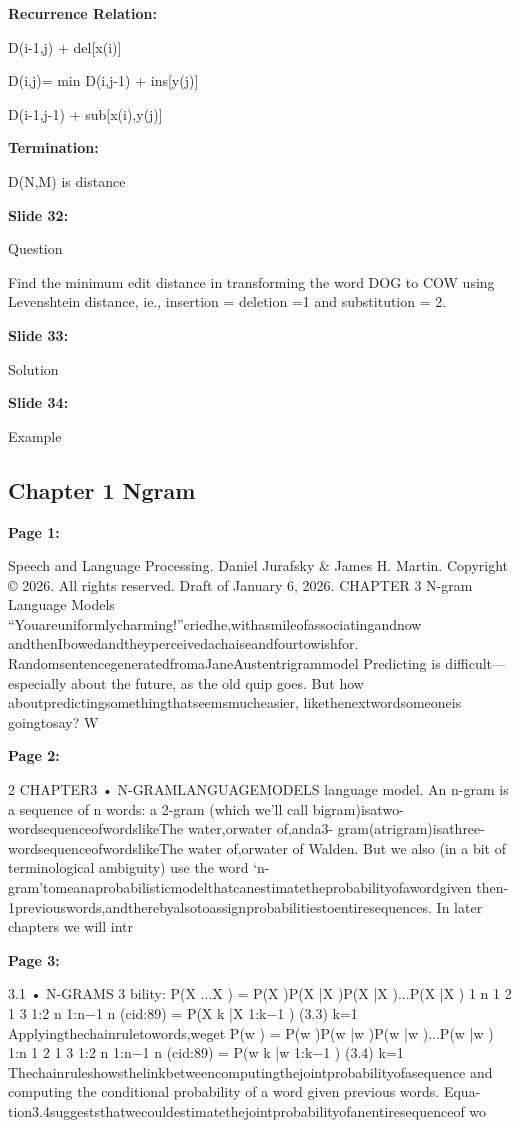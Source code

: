\documentclass[11pt,a4paper]{article}
\begin{document}
\textbf{Recurrence Relation:} 

D(i-1,j)   + del[x(i)]

D(i,j)= min  D(i,j-1)   + ins[y(j)]

D(i-1,j-1) + sub[x(i),y(j)]

\textbf{Termination:} 

D(N,M) is distance

\textbf{Slide 32:}

Question

Find the minimum edit distance in transforming the word DOG to COW using Levenshtein distance, ie., insertion = deletion =1 and substitution = 2.

\textbf{Slide 33:}

Solution

\textbf{Slide 34:}

Example


\subsection{Chapter 1 Ngram}

\textbf{Page 1:}

Speech and Language Processing. Daniel Jurafsky & James H. Martin. Copyright © 2026. All
rights reserved. Draft of January 6, 2026.
CHAPTER
3 N-gram Language Models
“Youareuniformlycharming!”criedhe,withasmileofassociatingandnow
andthenIbowedandtheyperceivedachaiseandfourtowishfor.
RandomsentencegeneratedfromaJaneAustentrigrammodel
Predicting is difficult—especially about the future, as the old quip goes. But how
aboutpredictingsomethingthatseemsmucheasier, likethenextwordsomeoneis
goingtosay? W

\textbf{Page 2:}

2 CHAPTER3 • N-GRAMLANGUAGEMODELS
language model. An n-gram is a sequence of n words: a 2-gram (which we’ll call
bigram)isatwo-wordsequenceofwordslikeThe water,orwater of,anda3-
gram(atrigram)isathree-wordsequenceofwordslikeThe water of,orwater
of Walden. But we also (in a bit of terminological ambiguity) use the word ‘n-
gram’tomeanaprobabilisticmodelthatcanestimatetheprobabilityofawordgiven
then-1previouswords,andtherebyalsotoassignprobabilitiestoentiresequences.
In later chapters we will intr

\textbf{Page 3:}

3.1 • N-GRAMS 3
bility:
P(X ...X ) = P(X )P(X |X )P(X |X )...P(X |X )
1 n 1 2 1 3 1:2 n 1:n−1
n
(cid:89)
= P(X k |X 1:k−1 ) (3.3)
k=1
Applyingthechainruletowords,weget
P(w ) = P(w )P(w |w )P(w |w )...P(w |w )
1:n 1 2 1 3 1:2 n 1:n−1
n
(cid:89)
= P(w k |w 1:k−1 ) (3.4)
k=1
Thechainruleshowsthelinkbetweencomputingthejointprobabilityofasequence
and computing the conditional probability of a word given previous words. Equa-
tion3.4suggeststhatwecouldestimatethejointprobabilityofanentiresequenceof
wo
\end{document}

